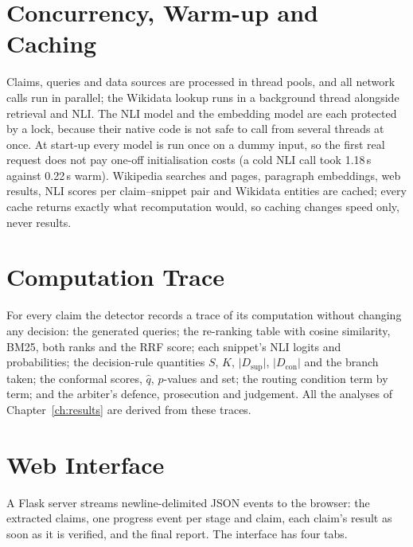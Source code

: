 \section{Concurrency, Warm-up and Caching}

Claims, queries and data sources are processed in thread pools, and all network calls run in parallel; the Wikidata lookup runs in a background thread alongside retrieval and NLI. The NLI model and the embedding model are each protected by a lock, because their native code is not safe to call from several threads at once. At start-up every model is run once on a dummy input, so the first real request does not pay one-off initialisation costs (a cold NLI call took 1.18\,s against 0.22\,s warm). Wikipedia searches and pages, paragraph embeddings, web results, NLI scores per claim--snippet pair and Wikidata entities are cached; every cache returns exactly what recomputation would, so caching changes speed only, never results.

\section{Computation Trace}

For every claim the detector records a trace of its computation without changing any decision: the generated queries; the re-ranking table with cosine similarity, BM25, both ranks and the RRF score; each snippet's NLI logits and probabilities; the decision-rule quantities $S$, $K$, $\lvert D_{\text{sup}} \rvert$, $\lvert D_{\text{con}} \rvert$ and the branch taken; the conformal scores, $\hat{q}$, $p$-values and set; the routing condition term by term; and the arbiter's defence, prosecution and judgement. All the analyses of Chapter~\ref{ch:results} are derived from these traces.

\section{Web Interface}

A Flask server streams newline-delimited JSON events to the browser: the extracted claims, one progress event per stage and claim, each claim's result as soon as it is verified, and the final report. The interface has four tabs.

